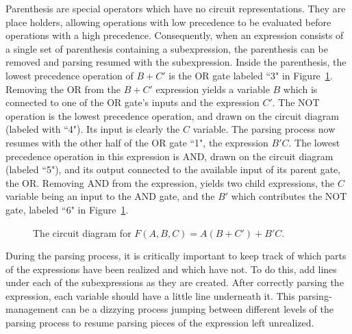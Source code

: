 Parenthesis are special
operators which have no circuit representations.  They are place holders,
allowing operations with low precedence to be evaluated before operations 
with a high precedence.  Consequently, when an expression consists of
a single set of parenthesis containing a subexpression, the parenthesis
can be removed and parsing resumed with the subexpression.  Inside the 
parenthesis, the lowest precedence operation of $B+C'$ is the OR gate 
labeled ``3" in Figure~\ref{fig:advance}.  Removing the OR from the 
$B+C'$ expression yields a variable $B$ which is connected to one of the
OR gate's inputs and the expression $C'$.  The NOT operation is the lowest
precedence operation, and drawn on the circuit diagram (labeled with ``4").
Its input is clearly the $C$ variable.  The parsing process now resumes
with the other half of the OR gate ``1", the expression $B'C$.  The lowest
precedence operation in this expression is AND, drawn on the circuit 
diagram (labeled ``5"), and its output connected to the available input 
of its parent gate, the OR.  Removing AND from the expression, yields two
child expressions, the $C$ variable being an input to the AND gate, and the
$B'$ which contributes the NOT gate, labeled ``6" in Figure~\ref{fig:advance}.  

\begin{figure}[ht]
\caption{The circuit diagram for $F(A,B,C)=A(B+C')+B'C$.}
\label{fig:advance}
\end{figure}

During the parsing process, it is critically important to keep track of which 
parts of the expressions have been realized and which have not.  To 
do this, add lines under each of the subexpressions as they are created.
After correctly parsing the expression, each variable should have a little
line underneath it.  This parsing-management can be a dizzying process 
jumping between different levels of the parsing process to resume 
parsing pieces of the expression left unrealized.

